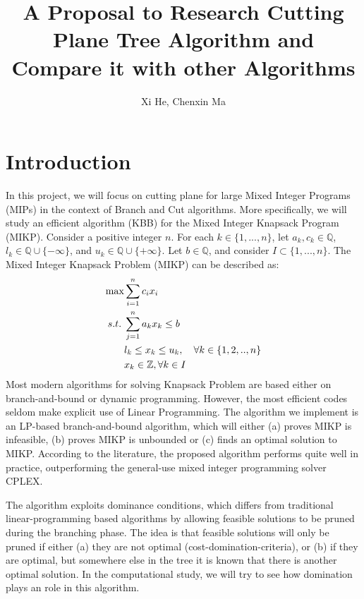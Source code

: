 \documentclass[a4paper,10pt]{article}
\title{A Proposal to Research Cutting Plane Tree Algorithm and Compare it with other Algorithms}
\author{Xi He, Chenxin Ma}
\begin{document}
\maketitle
 
\section{Introduction} 

In this project, we will focus on cutting plane for large Mixed Integer Programs (MIPs) in the context of Branch and Cut algorithms. More specifically, we will study an efficient algorithm (KBB) for the Mixed Integer Knapsack Program (MIKP). 
Consider a positive integer $n$. For each $k\in\{1,...,n\}$, let $a_k, c_k\in \mathbb Q$, $l_k\in \mathbb Q\cup \{-\infty\}$, and $u_k\in \mathbb Q\cup \{+\infty\}$. Let $b\in\mathbb Q$, and consider $I\subset \{1,...,n\}$. The Mixed Integer Knapsack Problem (MIKP) can be described as:
\begin{align}
\max &\sum_{i=1}^{n}c_ix_i \notag\\
s.t. \; &\sum_{j=1}^{n} a_{k}x_k\leq b \notag\\
&l_k\leq x_k\leq u_k,\quad\forall k\in\{1,2,..,n\} \notag\\
&x_k\in \mathbb Z, \forall k\in I
\end{align} 
Most modern algorithms for solving Knapsack Problem are based either on branch-and-bound or dynamic programming. However, the most efficient codes seldom make explicit use of Linear Programming. The algorithm we implement is an LP-based branch-and-bound algorithm,  which will either (a) proves MIKP is infeasible, (b) proves MIKP is unbounded or (c) finds an optimal solution to MIKP. According to the literature, the proposed algorithm performs quite well in practice, outperforming the general-use mixed integer programming solver CPLEX. 

The algorithm exploits dominance conditions, which differs from traditional linear-programming based algorithms by allowing feasible solutions to be pruned during the branching phase. The idea is that feasible solutions will only be pruned if either (a) they are not optimal (cost-domination-criteria), or (b) if they are optimal, but somewhere else in the tree it is known that there is another optimal solution. In the computational study, we will try to see how  domination plays an role in this algorithm.
\end{document}
